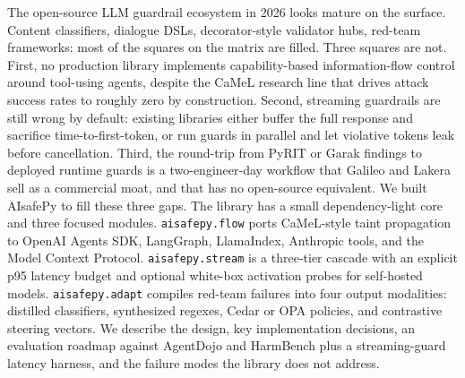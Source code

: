 The open-source LLM guardrail ecosystem in 2026 looks mature on the
surface. Content classifiers, dialogue DSLs, decorator-style
validator hubs, red-team frameworks: most of the squares on the
matrix are filled. Three squares are not. First, no production
library implements capability-based information-flow control around
tool-using agents, despite the CaMeL research line that drives
attack success rates to roughly zero by construction. Second, streaming guardrails are still wrong by
default: existing libraries either buffer the full response and
sacrifice time-to-first-token, or run guards in parallel and let
violative tokens leak before cancellation. Third, the round-trip
from PyRIT or Garak findings to deployed runtime guards is a
two-engineer-day workflow that Galileo and Lakera sell as a
commercial moat, and that has no open-source equivalent. We built
AIsafePy to fill these three gaps. The library has a small
dependency-light core and three focused modules.
\texttt{aisafepy.flow} ports CaMeL-style taint propagation to
OpenAI Agents SDK, LangGraph, LlamaIndex, Anthropic tools, and the
Model Context Protocol. \texttt{aisafepy.stream} is a three-tier
cascade with an explicit p95 latency budget and optional white-box
activation probes for self-hosted models. \texttt{aisafepy.adapt}
compiles red-team failures into four output modalities: distilled
classifiers, synthesized regexes, Cedar or OPA policies, and
contrastive steering vectors. We describe the design, key
implementation decisions, an evaluation roadmap against AgentDojo
and HarmBench plus a streaming-guard latency harness, and the
failure modes the library does not address.
